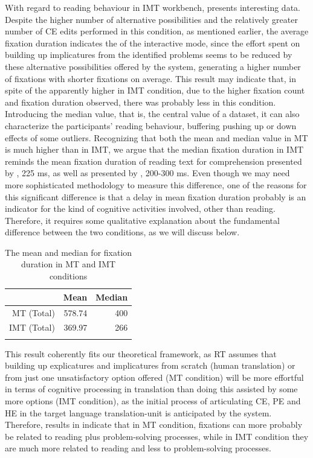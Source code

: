 \documentclass[output=paper]{langsci/langscibook}
\begin{document}
With regard to reading behaviour in IMT workbench,  presents interesting data. Despite the higher number of alternative possibilities and the relatively greater number of CE edits performed in this condition, as mentioned earlier, the average fixation duration indicates the  of the interactive mode, since the effort spent on building up implicatures from the identified  problems seems to be reduced by these alternative possibilities offered by the system, generating a higher number of fixations with shorter fixations on average. This result may indicate that, in spite of the apparently higher  in IMT condition, due to the higher fixation count and fixation duration observed, there was probably less  in this condition. Introducing the median value, that is, the central value of a dataset, it can also characterize the participants' reading behaviour, buffering pushing up or down effects of some outliers. Recognizing that both the mean and median value in MT is much higher than in IMT, we argue that the median fixation duration in IMT reminds the mean fixation duration of reading text for comprehension presented by \citet{Just1980}, 225 ms, as well as presented by \citet{rayner1998}, 200-300 ms. Even though we may need more sophisticated methodology to measure this difference, one of the reasons for this significant difference is that a delay in mean fixation duration probably is an indicator for the kind of cognitive activities involved, other than reading. Therefore, it requires some qualitative explanation about the fundamental difference between the two  conditions, as we will discuss below. 

\begin{table}
\begin{tabular}{rrr}
\lsptoprule
& Mean & Median\\
\midrule
MT (Total) & 578.74 & 400\\
IMT (Total) & 369.97 & 266\\
\lspbottomrule
\end{tabular}
\caption{The mean and median for fixation duration in MT and IMT conditions}
\label{sarto:tab:4}
\end{table}


This result coherently fits our theoretical framework, as RT assumes that building up explicatures and implicatures from scratch (human translation) or from just one unsatisfactory option offered (MT condition) will be more effortful in terms of cognitive processing in translation than doing this assisted by some more options (IMT condition), as the initial process of articulating CE, PE and HE in the target language translation-unit is anticipated by the system. Therefore, results in  indicate that in MT condition, fixations can more probably be related to reading plus problem-solving processes, while in IMT condition they are much more related to reading and less to problem-solving processes.
\end{document}
